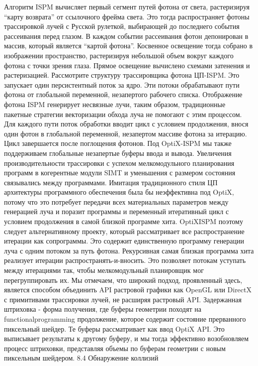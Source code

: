 Алгоритм ISPM вычисляет первый сегмент путей фотона от света, растеризируя “карту возврата” от ссылочного фрейма света. Это тогда распространяет фотоны трассировкой лучей с Русской рулеткой, выбирающей до последнего события рассеивания перед глазом. В каждом событии рассеивания фотон депонирован в массив, который является “картой фотона”. Косвенное освещение тогда собрано в изображении
пространство, растеризируя небольшой объем вокруг каждого фотона с точки зрения глаза. Прямое освещение вычислено схемами затенения и растеризацией.
Рассмотрите структуру трассировщика фотона ЦП-ISPM. Это запускает один персистентный поток за ядро. Эти потоки обрабатывают пути фотона от глобальной переменной, незапертого рабочего списка. Отображение фотона ISPM генерирует несвязные лучи, таким образом, традиционные пакетные стратегии векторизации обхода луча не помогают с этим процессом. Для каждого пути поток обработки вводит цикл с условием продолжения, внося один фотон в глобальной переменной, незапертом массиве фотона за итерацию. Цикл завершается после поглощения фотонов.
Под OptiX-ISPM мы также поддерживаем глобальные незапертые буферы ввода и вывода. Увеличения производительности трассировки с успехом мелкомодульного планирования программ в когерентные модули SIMT и уменьшения с размером состояния связывались между программами.
Имитация традиционного стиля ЦП архитектуры программного обеспечения была бы неэффективна под OptiX, потому что это потребует передачи всех материальных параметров между генерацией луча и поразит программы и переменный итеративный цикл с условием продолжения в самой близкой программе хита. OptiXISPM поэтому следует альтернативному проекту, который рассматривает все распространение
итерации как сопрограммы. Это содержит единственную программу генерации луча с одним потоком за путь фотона. Рекурсивная самая близкая программа хита реализует итерации распространять-и-вносить. Это позволяет потокам уступать между итерациями так, чтобы мелкомодульный планировщик мог перегруппировать их. Мы отмечаем, что широкий подход, проявленный здесь, является способом объединить API растровой графики как OpenGL или DirectX с примитивами трассировки лучей, не расширяя растровый API. Задержанная штриховка - форма получения, где буферы геометрии походят на functionalprogramming
продолжение, которое содержит состояние прерванного
пиксельный шейдер. Те буферы рассматривает как ввод OptiX API. Это выписывает результаты к другому буферу, и мы тогда эффективно возобновляем процесс штриховки, представляя объемы по буферам геометрии с новым пиксельным шейдером.
8.4 Обнаружение коллизий
